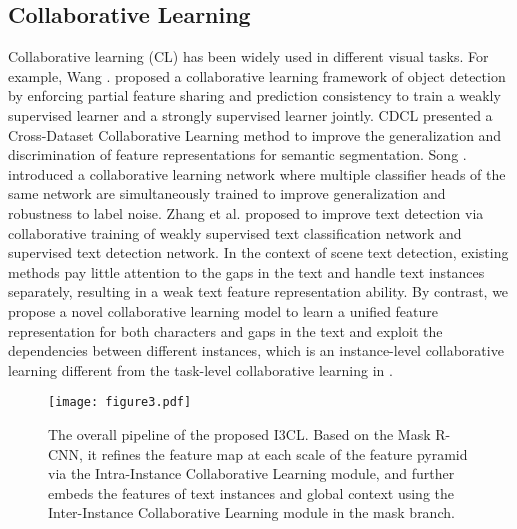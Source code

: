 \subsection{Collaborative Learning}
Collaborative learning (CL) has been widely used in different visual tasks. For example, Wang  . \citep{wang2018collaborative} proposed a collaborative learning framework of object detection by enforcing partial feature sharing and prediction consistency to train a weakly supervised learner and a strongly supervised learner jointly. CDCL \citep{cdcl} presented a Cross-Dataset Collaborative Learning method to improve the generalization and discrimination of feature representations for semantic segmentation. Song  . \citep{song} introduced a collaborative learning network where multiple classifier heads of the same network are simultaneously trained to improve generalization and robustness to label noise.  Zhang et al.\citep{cln} proposed to improve text detection via collaborative training of weakly supervised text classification network and supervised text detection network. In the context of scene text detection, existing methods pay little attention to the gaps in the text and handle text instances separately, resulting in a weak text feature representation ability. By contrast, we propose a novel collaborative learning model to learn a unified feature representation for both characters and gaps in the text and exploit the dependencies between different instances, which is an instance-level collaborative learning different from the task-level collaborative learning in \citep{cln}.

\begin{figure*}[ht]
  \centering
  \texttt{[image: figure3.pdf]}
  \caption{The overall pipeline of the proposed I3CL. Based on the Mask R-CNN, it refines the feature map at each scale of the feature pyramid via the Intra-Instance Collaborative Learning module, and further embeds the features of text instances and global context using the Inter-Instance Collaborative Learning module in the mask branch.}
  \label{fig3}
\end{figure*}

